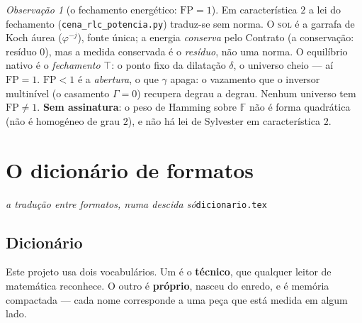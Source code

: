 \documentclass[11pt]{article}
\newcommand{\code}[1]{\texttt{\small #1}}
\theoremstyle{plain}
\theoremstyle{remark}
\providecommand{\FF}{\ensuremath{\mathbb{F}}}
\newtheorem{observacao}[teorema]{Observação}
\begin{document}
\begin{observacao}[o fechamento energético: $\mathrm{FP}=1$]\label{obs:fp}
Em característica $2$ a lei do fechamento (\code{cena\_rlc\_potencia.py}) traduz-se sem norma. O \textsc{sol} é a
garrafa de Koch áurea ($\varphi^{-j}$), fonte única; a energia \emph{conserva} pelo Contrato (a conservação: resíduo $0$), mas a medida conservada é o \emph{resíduo}, não uma norma. O equilíbrio nativo é o \emph{fechamento}
$\top$: o ponto fixo da dilatação $\delta$, o universo cheio --- aí $\mathrm{FP}=1$. $\mathrm{FP}<1$ é a
\emph{abertura}, o que $\gamma$ apaga: o vazamento que o inversor multinível (o casamento $\Gamma=0$) recupera
degrau a degrau. Nenhum universo tem $\mathrm{FP}\neq1$. \textbf{Sem assinatura}: o peso de Hamming sobre $\FF$
não é forma quadrática (não é homogéneo de grau $2$), e não há lei de Sylvester em característica $2$.
\end{observacao}



\section{O dicionário de formatos}

\noindent\emph{a tradução entre formatos, numa descida só}\hfill\code{dicionario.tex}


\subsection{Dicionário}
\label{sec:dicionario}

Este projeto usa dois vocabulários. Um é o \textbf{técnico}, que qualquer leitor de matemática
reconhece. O outro é \textbf{próprio}, nasceu do enredo, e é memória compactada --- cada nome
corresponde a uma peça que está medida em algum lado.
\end{document}

